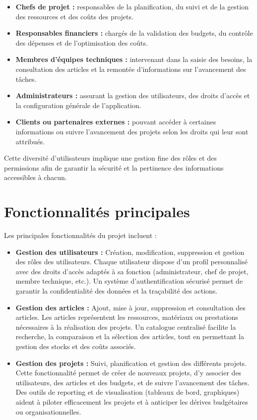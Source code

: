 \documentclass[12pt,a4paper]{report}
\begin{document}
\begin{itemize}
    \item \textbf{Chefs de projet :} responsables de la planification, du suivi et de la gestion des ressources et des coûts des projets.
    \item \textbf{Responsables financiers :} chargés de la validation des budgets, du contrôle des dépenses et de l’optimisation des coûts.
    \item \textbf{Membres d’équipes techniques :} intervenant dans la saisie des besoins, la consultation des articles et la remontée d’informations sur l’avancement des tâches.
    \item \textbf{Administrateurs :} assurant la gestion des utilisateurs, des droits d’accès et la configuration générale de l’application.
    \item \textbf{Clients ou partenaires externes :} pouvant accéder à certaines informations ou suivre l’avancement des projets selon les droits qui leur sont attribués.
\end{itemize}

Cette diversité d’utilisateurs implique une gestion fine des rôles et des permissions afin de garantir la sécurité et la pertinence des informations accessibles à chacun.
\section{Fonctionnalités principales}
Les principales fonctionnalités du projet incluent :
\begin{itemize}
    \item \textbf{Gestion des utilisateurs :} Création, modification, suppression et gestion des rôles des utilisateurs. Chaque utilisateur dispose d’un profil personnalisé avec des droits d’accès adaptés à sa fonction (administrateur, chef de projet, membre technique, etc.). Un système d’authentification sécurisé permet de garantir la confidentialité des données et la traçabilité des actions.
    \item \textbf{Gestion des articles :} Ajout, mise à jour, suppression et consultation des articles. Les articles représentent les ressources, matériaux ou prestations nécessaires à la réalisation des projets. Un catalogue centralisé facilite la recherche, la comparaison et la sélection des articles, tout en permettant la gestion des stocks et des coûts associés.
    \item \textbf{Gestion des projets :} Suivi, planification et gestion des différents projets. Cette fonctionnalité permet de créer de nouveaux projets, d’y associer des utilisateurs, des articles et des budgets, et de suivre l’avancement des tâches. Des outils de reporting et de visualisation (tableaux de bord, graphiques) aident à piloter efficacement les projets et à anticiper les dérives budgétaires ou organisationnelles.
\end{itemize}
\end{document}
